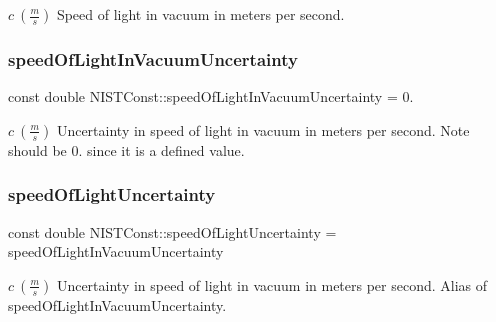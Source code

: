 $c \ (\frac{m}{s})$ Speed of light in vacuum in meters per second. \mbox{\label{group___n_i_s_t_const-_speed_of_light_gafb67b7afe777d6e23a70ae69e83542d1}} 
\subsubsection{\texorpdfstring{speed\+Of\+Light\+In\+Vacuum\+Uncertainty}{speedOfLightInVacuumUncertainty}}
{\footnotesize\ttfamily const double N\+I\+S\+T\+Const\+::speed\+Of\+Light\+In\+Vacuum\+Uncertainty = 0.}

$c \ (\frac{m}{s})$ Uncertainty in speed of light in vacuum in meters per second. Note should be 0. since it is a defined value. \mbox{\label{group___n_i_s_t_const-_speed_of_light_ga456f26aa497d53d4b78f7a4d7644c269}} 
\subsubsection{\texorpdfstring{speed\+Of\+Light\+Uncertainty}{speedOfLightUncertainty}}
{\footnotesize\ttfamily const double N\+I\+S\+T\+Const\+::speed\+Of\+Light\+Uncertainty = speed\+Of\+Light\+In\+Vacuum\+Uncertainty}

$c \ (\frac{m}{s})$ Uncertainty in speed of light in vacuum in meters per second. Alias of speed\+Of\+Light\+In\+Vacuum\+Uncertainty. 